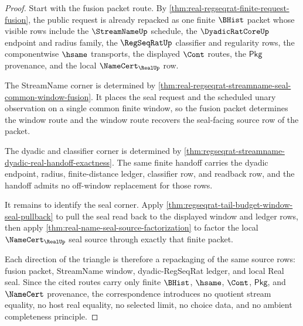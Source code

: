 \begin{proof}
Start with the fusion packet route. By \autoref{thm:real-regseqrat-finite-request-fusion}, the public request is already repacked as one finite $\BHist$ packet whose visible rows include the $\StreamNameUp$ schedule, the $\DyadicRatCoreUp$ endpoint and radius family, the $\RegSeqRatUp$ classifier and regularity rows, the componentwise $\hsame$ transports, the displayed $\Cont$ routes, the $\mathsf{Pkg}$ provenance, and the local $\NameCert_{\RealUp}$ row.

The StreamName corner is determined by \autoref{thm:real-regseqrat-streamname-seal-common-window-fusion}. It places the seal request and the scheduled unary observation on a single common finite window, so the fusion packet determines the window route and the window route recovers the seal-facing source row of the packet.

The dyadic and classifier corner is determined by \autoref{thm:regseqrat-streamname-dyadic-real-handoff-exactness}. The same finite handoff carries the dyadic endpoint, radius, finite-distance ledger, classifier row, and readback row, and the handoff admits no off-window replacement for those rows.

It remains to identify the seal corner. Apply \autoref{thm:regseqrat-tail-budget-window-seal-pullback} to pull the seal read back to the displayed window and ledger rows, then apply \autoref{thm:real-name-seal-source-factorization} to factor the local $\NameCert_{\RealUp}$ seal source through exactly that finite packet.

Each direction of the triangle is therefore a repackaging of the same source rows: fusion packet, StreamName window, dyadic-RegSeqRat ledger, and local Real seal. Since the cited routes carry only finite $\BHist$, $\hsame$, $\Cont$, $\mathsf{Pkg}$, and $\NameCert$ provenance, the correspondence introduces no quotient stream equality, no host real equality, no selected limit, no choice data, and no ambient completeness principle.
\end{proof}

